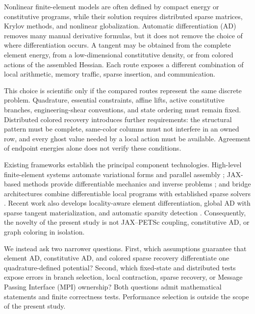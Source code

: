 Nonlinear finite-element models are often defined by compact energy or
constitutive programs, while their solution requires distributed sparse
matrices, Krylov methods, and nonlinear globalization. Automatic
differentiation (AD) removes many manual derivative formulas, but it does not
remove the choice of where differentiation occurs. A tangent may be obtained
from the complete element energy, from a low-dimensional constitutive density,
or from colored actions of the assembled Hessian. Each route exposes a
different combination of local arithmetic, memory traffic, sparse insertion,
and communication.

This choice is scientific only if the compared routes represent the same
discrete problem. Quadrature, essential constraints, affine lifts, active
constitutive branches, engineering-shear conventions, and state ordering must
remain fixed. Distributed colored recovery introduces further requirements:
the structural pattern must be complete, same-color columns must not interfere
in an owned row, and every ghost value needed by a local action must be
available. Agreement of endpoint energies alone does not verify these
conditions.

Existing frameworks establish the principal component technologies. High-level
finite-element systems automate variational forms and parallel assembly
\citep{logg2012fenicsbook,baratta2025dolfinx}; JAX-based methods provide
differentiable mechanics and inverse problems
\citep{xue2023jaxfem,xue2026implicit}; and bridge architectures combine
differentiable local programs with established sparse solvers
\citep{yashchuk2023bringing,latyshev2025externaloperators,cattaneo2026jetsci}.
Recent work also develops locality-aware element differentiation, global AD
with sparse tangent materialization, and automatic sparsity detection
\citep{mahmoud2025locality,pundir2026tatva,hill2025sparser}. Consequently, the
novelty of the present study is not JAX--PETSc coupling, constitutive AD, or
graph coloring in isolation.

We instead ask two narrower questions. First, which assumptions guarantee that
element AD, constitutive AD, and colored sparse recovery differentiate one
quadrature-defined potential? Second, which fixed-state and distributed tests
expose errors in branch selection, local contraction, sparse recovery, or
Message Passing Interface (MPI) ownership? Both questions admit mathematical
statements and finite correctness tests. Performance selection is outside the
scope of the present study.


